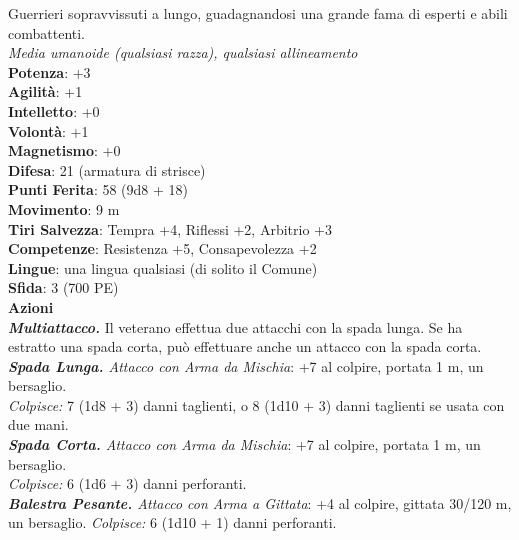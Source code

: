 \begin{multicols}{2}
Guerrieri sopravvissuti a lungo, guadagnandosi una grande fama di esperti e abili combattenti.\\
\emph{Media umanoide (qualsiasi razza), qualsiasi allineamento}\\
\textbf{Potenza}: +3\\
\textbf{Agilità}: +1\\
\textbf{Intelletto}: +0\\
\textbf{Volontà}: +1\\
\textbf{Magnetismo}: +0\\
\textbf{Difesa}: 21 (armatura di strisce)\\
\textbf{Punti Ferita}: 58 (9d8 + 18)\\
\textbf{Movimento}: 9 m\\
\textbf{Tiri Salvezza}: Tempra +4, Riflessi +2, Arbitrio +3 \\
\textbf{Competenze}: Resistenza +5, Consapevolezza +2\\
\textbf{Lingue}: una lingua qualsiasi (di solito il Comune)\\
\textbf{Sfida}: 3 (700 PE)\smallskip\\
\smallskip\textbf{Azioni}\\
\emph{\textbf{Multiattacco.}} Il veterano effettua due attacchi con la spada lunga. Se ha estratto una spada corta, può effettuare anche un attacco con la spada corta.
\emph{\textbf{Spada Lunga.} Attacco con Arma da Mischia}: +7 al colpire, portata 1 m, un bersaglio.\\
\emph{Colpisce:} 7 (1d8 + 3) danni taglienti, o 8 (1d10 + 3) danni taglienti se usata con due mani.\\
\emph{\textbf{Spada Corta.} Attacco con Arma da Mischia}: +7 al colpire, portata 1 m, un bersaglio.\\
\emph{Colpisce:} 6 (1d6 + 3) danni perforanti.\\
\emph{\textbf{Balestra Pesante.} Attacco con Arma a Gittata}: +4 al colpire, gittata 30/120 m, un bersaglio. \emph{Colpisce:} 6 (1d10 + 1) danni perforanti.\\


\end{multicols}
